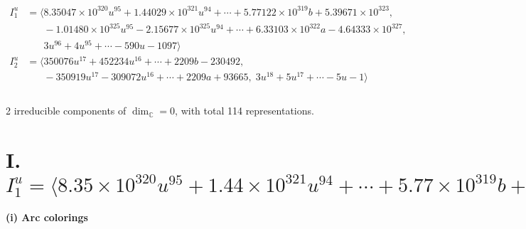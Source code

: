 \documentclass[1p]{elsarticle_modified}
\theoremstyle{definition}
\begin{document}
\begin{align*}
I^u_{1}&=\langle 
8.35047\times10^{320} u^{95}+1.44029\times10^{321} u^{94}+\cdots+5.77122\times10^{319} b+5.39671\times10^{323},\\
\phantom{I^u_{1}}&\phantom{= \langle  }-1.01480\times10^{325} u^{95}-2.15677\times10^{325} u^{94}+\cdots+6.33103\times10^{322} a-4.64333\times10^{327},\\
\phantom{I^u_{1}}&\phantom{= \langle  }3 u^{96}+4 u^{95}+\cdots-590 u-1097\rangle \\
I^u_{2}&=\langle 
350076 u^{17}+452234 u^{16}+\cdots+2209 b-230492,\\
\phantom{I^u_{2}}&\phantom{= \langle  }-350919 u^{17}-309072 u^{16}+\cdots+2209 a+93665,\;3 u^{18}+5 u^{17}+\cdots-5 u-1\rangle \\
\\
\end{align*}
\raggedright * 2 irreducible components of $\dim_{\mathbb{C}}=0$, with total 114 representations.\\
\newpage
\renewcommand{\arraystretch}{1}
\centering \section*{I. $I^u_{1}= \langle 8.35\times10^{320} u^{95}+1.44\times10^{321} u^{94}+\cdots+5.77\times10^{319} b+5.40\times10^{323},\;-1.01\times10^{325} u^{95}-2.16\times10^{325} u^{94}+\cdots+6.33\times10^{322} a-4.64\times10^{327},\;3 u^{96}+4 u^{95}+\cdots-590 u-1097 \rangle$}
\flushleft \textbf{(i) Arc colorings}\\
\end{document}
